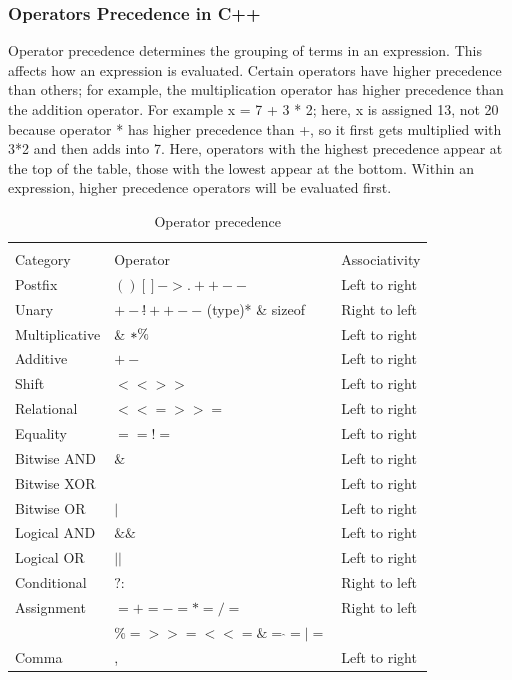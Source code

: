 \documentclass{book}
\begin{document}
\subsubsection{Operators Precedence in C++}

Operator precedence determines the grouping of terms in an expression. This affects how an expression is evaluated. Certain operators have higher precedence than others; for example, the multiplication operator has higher precedence than the addition operator. For example x = 7 + 3 * 2; here, x is assigned 13, not 20 because operator * has higher precedence than +, so it first gets multiplied with 3*2 and then adds into 7. Here, operators with the highest precedence appear at the top of the table, those with the lowest appear at the bottom. Within an expression, higher precedence operators will be evaluated first.

\begin{table}[h]
\tiny
\centering 
\begin{tabular}{lll} \hline \\
Category 	& Operator 	& Associativity  \\ \hline 
Postfix 	& $() [] -> . ++ - -$  &	Left to right \\
Unary 	& $+ - ! \tilde{} ++ - -$ (type)* \& sizeof 	& Right to left \\
Multiplicative  &	\& $* \/ \%$ 	& Left to right \\
Additive  	& $+ - $ & Left to right \\
Shift  	& $<< >>$ &	Left to right \\
Relational  &	$< <= > >=$ &	Left to right \\
Equality  &	$== != $ &	Left to right \\
Bitwise AND &	\& 	& Left to right \\
Bitwise XOR &	\hat{} &Left to right \\
Bitwise OR 	& $|$ &	Left to right \\
Logical AND 	& $\&\&$ &	Left to right \\
Logical OR 	& $||$ & 	Left to right \\
Conditional &	$?:$ & 	Right to left  \\
Assignment 	& $= += -= *= /= $ & 	Right to left  \\
& $\%=>>= <<= \&= \hat{}= |=$ & \\
Comma 	& , &	Left to right \\ \hline 

\end{tabular}
\caption{Operator precedence}
\label{}
\end{table}
\end{document}
